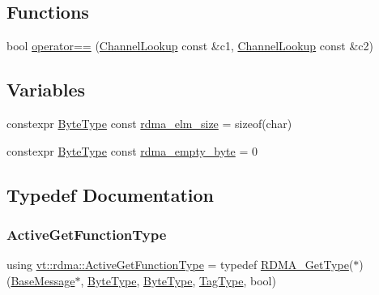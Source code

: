 \subsection*{Functions}
\begin{DoxyCompactItemize}
\item 
bool \hyperlink{namespacevt_1_1rdma_a176cd995a0222c9fef4030d3ac0ed08e}{operator==} (\hyperlink{structvt_1_1rdma_1_1_channel_lookup}{Channel\+Lookup} const \&c1, \hyperlink{structvt_1_1rdma_1_1_channel_lookup}{Channel\+Lookup} const \&c2)
\end{DoxyCompactItemize}
\subsection*{Variables}
\begin{DoxyCompactItemize}
\item 
constexpr \hyperlink{namespacevt_aab8d55968084610ce3b17057981e9300}{Byte\+Type} const \hyperlink{namespacevt_1_1rdma_ad167cbb60749088647bbeee80ded6100}{rdma\+\_\+elm\+\_\+size} = sizeof(char)
\item 
constexpr \hyperlink{namespacevt_aab8d55968084610ce3b17057981e9300}{Byte\+Type} const \hyperlink{namespacevt_1_1rdma_aa4cbaba7c412337495b61a42d3eb134c}{rdma\+\_\+empty\+\_\+byte} = 0
\end{DoxyCompactItemize}


\subsection{Typedef Documentation}
\mbox{\label{namespacevt_1_1rdma_af564945ba7e35e15bccfb9c2a8d7ebd7}} 
\subsubsection{\texorpdfstring{Active\+Get\+Function\+Type}{ActiveGetFunctionType}}
{\footnotesize\ttfamily using \hyperlink{namespacevt_1_1rdma_af564945ba7e35e15bccfb9c2a8d7ebd7}{vt\+::rdma\+::\+Active\+Get\+Function\+Type} = typedef \hyperlink{namespacevt_a1cab7f4860f65a49ad2c042d6240f288}{R\+D\+M\+A\+\_\+\+Get\+Type}($\ast$)(\hyperlink{namespacevt_ac34f95a5e2b8109b55bfba52b074443d}{Base\+Message}$\ast$, \hyperlink{namespacevt_aab8d55968084610ce3b17057981e9300}{Byte\+Type}, \hyperlink{namespacevt_aab8d55968084610ce3b17057981e9300}{Byte\+Type}, \hyperlink{namespacevt_a84ab281dae04a52a4b243d6bf62d0e52}{Tag\+Type}, bool)}

